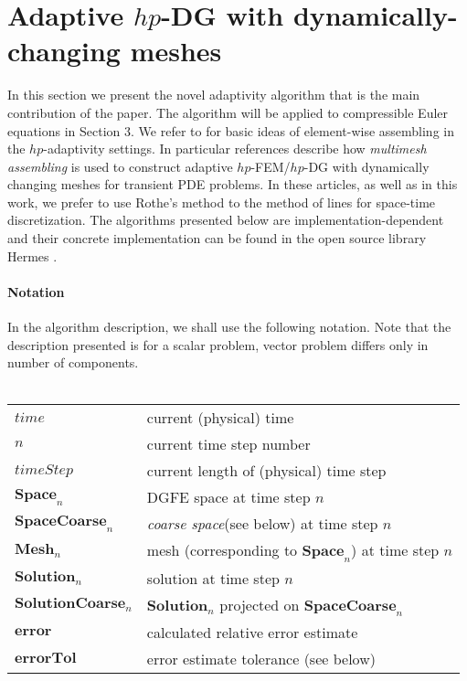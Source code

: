 \vspace{5mm}
\section{Adaptive $hp$-DG with dynamically-changing meshes}

In this section we present the novel adaptivity algorithm that is the main contribution of the paper.
The algorithm will be applied to compressible Euler equations in Section 3.
We refer to \cite{dubcova,multimesh1,multimesh2} for basic ideas of element-wise assembling in the $hp$-adaptivity settings.
In particular references \cite{dubcova,multimesh2} describe how \emph{multimesh assembling} is 
used to construct adaptive $hp$-FEM/$hp$-DG with dynamically 
changing meshes for transient PDE problems.
In these articles, as well as in this work, we prefer to use Rothe's method to the method of lines for space-time discretization.
The algorithms presented below are implementation-dependent and their concrete 
implementation can be found in the open source library Hermes \cite{hermes}.
\paragraph{Notation}
In the algorithm description, we shall use the following notation. Note that the description presented is for a scalar problem, vector problem differs only in number of components.\\
\\
\begin{tabular}[t]{ll}
$time$&current (physical) time \\
$n$&current time step number \\
$timeStep$&current length of (physical) time step\\
$\mathbf{Space}_n$&DGFE space at time step $n$\\
$\mathbf{SpaceCoarse}_n$&\emph{coarse space}(see below) at time step $n$\\
$\mathbf{Mesh}_n$&mesh (corresponding to $\mathbf{Space}_n$) at time step $n$\\
$\mathbf{Solution}_n$&solution at time step $n$\\
$\mathbf{SolutionCoarse}_n$&$\mathbf{Solution}_n$ projected on $\mathbf{SpaceCoarse}_n$\\
$\mathbf{error}$&calculated relative error estimate\\
$\mathbf{errorTol}$&error estimate tolerance (see below)
\end{tabular}
